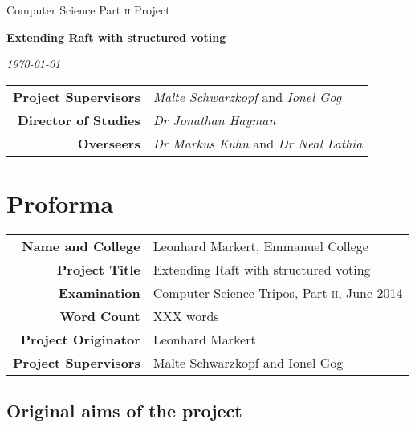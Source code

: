 \documentclass[11pt,chapterprefix=true,toc=bibliography,numbers=noendperiod,
               footnotes=multiple,twoside]{scrreprt}
\begin{document}
{}

\begin{titlepage}

 \medskip
{} \medskip
{}

\vfil

\centerline{\large Computer Science Part \textsc{ii} Project} \vspace{0.4in}
\centerline{\Large\textbf{Extending Raft with structured voting}} \vspace{0.3in}
\centerline{\large\textit{\today}}

\vfil

\begin{center}
{\renewcommand{\arraystretch}{2}%
\begin{tabularx}{316pt}{rX}
\textbf{Project Supervisors} & \textit{Malte Schwarzkopf} and \textit{Ionel Gog} \\
\textbf{Director of Studies} & \textit{Dr Jonathan Hayman} \\
\textbf{Overseers} & \textit{Dr Markus Kuhn} and \textit{Dr Neal Lathia}
\end{tabularx}}
\end{center}

\end{titlepage}

\chapter*{Proforma\label{ch:proforma}}

\begin{center}
{\renewcommand{\arraystretch}{1.5}%
\begin{tabularx}{330pt}{rX}
\textbf{Name and College} & Leonhard Markert, Emmanuel College \\
\textbf{Project Title} & Extending Raft with structured voting \\
\textbf{Examination} & Computer Science Tripos, Part \textsc{ii}, June 2014 \\
\textbf{Word Count} & XXX words \\
\textbf{Project Originator} & Leonhard Markert \\
\textbf{Project Supervisors} & Malte Schwarzkopf and Ionel Gog
\end{tabularx}}
\end{center}

\section*{Original aims of the project\label{sc:original-aims}}
\end{document}
